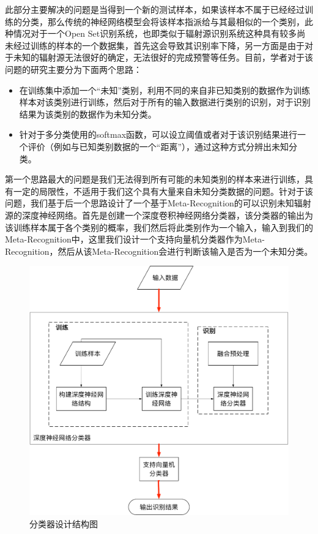 此部分主要解决的问题是当得到一个新的测试样本，如果该样本不属于已经经过训练的分类，那么传统的神经网络模型会将该样本指派给与其最相似的一个类别，此种情况对于一个Open Set识别系统，也即类似于辐射源识别系统这种具有较多尚未经过训练的样本的一个数据集，首先这会导致其识别率下降，另一方面是由于对于未知的辐射源无法很好的确定，无法很好的完成预警等任务。目前，学者对于该问题的研究主要分为下面两个思路：
\begin{itemize}
	\item 在训练集中添加一个“未知”类别，利用不同的来自非已知类别的数据作为训练样本对该类别进行训练，然后对于所有的输入数据进行类别的识别，对于识别结果为该类别的数据作为未知分类。
	\item 针对于多分类使用的softmax函数，可以设立阈值或者对于该识别结果进行一个评价（例如与已知类别数据的一个“距离”），通过这种方式分辨出未知分类。
\end{itemize}
第一个思路最大的问题是我们无法得到所有可能的未知类别的样本来进行训练，具有一定的局限性，不适用于我们这个具有大量来自未知分类数据的问题。针对于该问题，我们基于后一个思路设计了一个基于Meta-Recognition的可以识别未知辐射源的深度神经网络。首先是创建一个深度卷积神经网络分类器，该分类器的输出为该训练样本属于各个类别的概率，我们然后将此类别作为一个输入，输入到我们的Meta-Recognition中，这里我们设计一个支持向量机分类器作为Meta-Recognition，然后从该Meta-Recognition会进行判断该输入是否为一个未知分类。
\begin{figure}[htb]
	\centering
	\includegraphics[width=\textwidth]{figures/emitter/frame_emitter}
	\caption{分类器设计结构图}
\end{figure}

